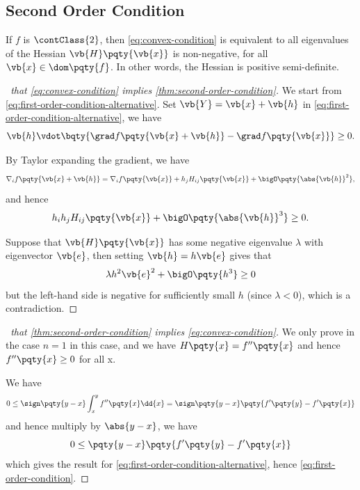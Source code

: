 \subsection{Second Order Condition}

\begin{theorem}
    \label{thm:second-order-condition}%
    If \(f\) is \(\contClass{2}\), then \eqref{eq:convex-condition} is equivalent to all eigenvalues of the Hessian \(\vb{H} \pqty{\vb{x}}\) is non-negative, for all \(\vb{x} \in \dom\pqty{f}\). In other words, the Hessian is positive semi-definite.
\end{theorem}

\begin{proof}[\proofname\ that \eqref{eq:convex-condition} implies \autoref{thm:second-order-condition}]
    We start from \eqref{eq:first-order-condition-alternative}. Set \(\vb{Y} = \vb{x} + \vb{h}\) in \eqref{eq:first-order-condition-alternative}, we have
    \[
        \vb{h} \vdot \bqty{\grad f\pqty{\vb{x} + \vb{h}} - \grad f\pqty{\vb{x}}} \geq 0.
    \]

    By Taylor expanding the gradient, we have
    \[
        \nabla_i f\pqty{\vb{x} + \vb{h}} = \nabla_i f \pqty{\vb{x}} + h_j H_{ij} \pqty{\vb{x}} + \bigO \pqty{\abs{\vb{h}}^2},
    \]
    and hence
    \[
        h_i h_j H_{ij} \pqty{\vb{x}} + \bigO \pqty{\abs{\vb{h}}^3} \geq 0.
    \]

    Suppose that \(\vb{H}\pqty{\vb{x}}\) has some negative eigenvalue \(\lambda\) with eigenvector \(\vb{e}\), then setting \(\vb{h} = h \vb{e}\) gives that
    \[
        \lambda h^2 \vb{e}^2 + \bigO \pqty{h^3} \geq 0
    \]
    but the left-hand side is negative for sufficiently small \(h\) (since \(\lambda < 0\)), which is a contradiction.
\end{proof}

\begin{proof}[\proofname\ that \autoref{thm:second-order-condition} implies \eqref{eq:convex-condition}]
    We only prove in the case \(n = 1\) in this case, and we have \(H\pqty{x} = f''\pqty{x}\) and hence \(f''\pqty{x} \geq 0\) for all x.

    We have
    \[
        0 \leq \sign \pqty{y - x} \int_{x}^{y} f'' \pqty{x} \dd{x} = \sign \pqty{y - x} \pqty{f'\pqty{y} - f'\pqty{x}}
    \]
    and hence multiply by \(\abs{y - x}\), we have
    \[
        0 \leq \pqty{y - x} \pqty{f'\pqty{y} - f'\pqty{x}}
    \]
    which gives the result for \eqref{eq:first-order-condition-alternative}, hence \eqref{eq:first-order-condition}.
\end{proof}

